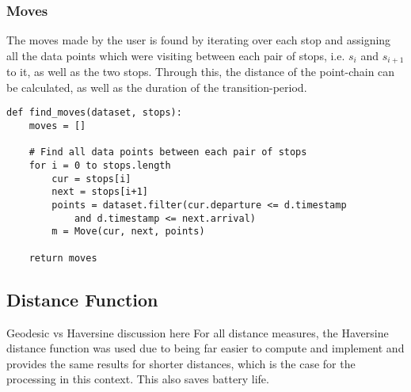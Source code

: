 \subsubsection{Moves}
The moves made by the user is found by iterating over each stop and assigning all the data points which were visiting between each pair of stops, i.e. $s_i$ and $s_{i + 1}$ to it, as well as the two stops. Through this, the distance of the point-chain can be calculated, as well as the duration of the transition-period.

\begin{verbatim}
def find_moves(dataset, stops):
    moves = []
    
    # Find all data points between each pair of stops
    for i = 0 to stops.length
        cur = stops[i]
        next = stops[i+1]
        points = dataset.filter(cur.departure <= d.timestamp 
            and d.timestamp <= next.arrival)
        m = Move(cur, next, points)
    
    return moves
\end{verbatim}

\subsection{Distance Function}
Geodesic vs Haversine discussion here
For all distance measures, the Haversine distance function was used due to being far easier to compute and implement and provides the same results for shorter distances, which is the case for the processing in this context. This also saves battery life. 

